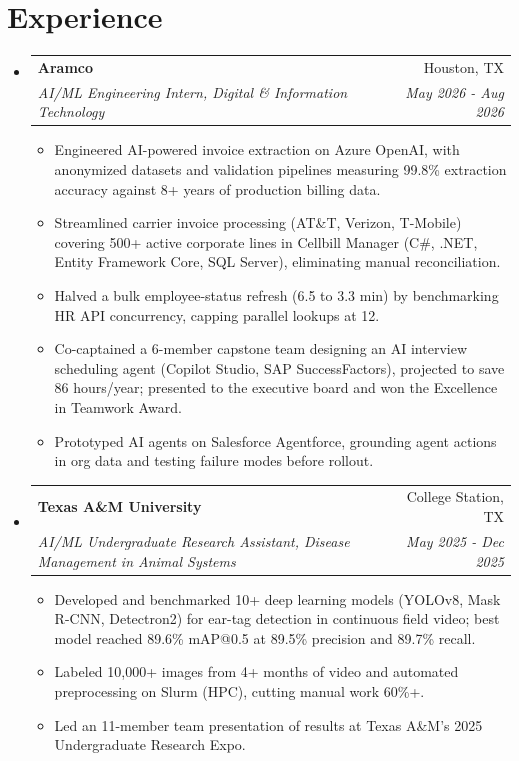 \documentclass[letterpaper,11pt]{article}
\makeatletter
\newcommand{\resumeItem}[1]{\item\small{{#1 \vspace{-2pt}}}}
\newcommand{\resumeSubheading}[4]{
  \vspace{-2pt}\item
    \begin{tabular*}{0.97\textwidth}[t]{l@{\extracolsep{\fill}}r}
      \textbf{#1} & #2 \\
      \textit{\small#3} & \textit{\small #4} \\
    \end{tabular*}\vspace{-7pt}
}
\newcommand{\resumeSubHeadingListStart}{\begin{itemize}[leftmargin=0.15in, label={}]}
\newcommand{\resumeSubHeadingListEnd}{\end{itemize}}
\newcommand{\resumeItemListStart}{\begin{itemize}}
\newcommand{\resumeItemListEnd}{\end{itemize}\vspace{-5pt}}
\makeatother
\begin{document}
\section{Experience}
  \resumeSubHeadingListStart
    \resumeSubheading
      {Aramco}{Houston, TX}
      {AI/ML Engineering Intern, Digital \& Information Technology}{May 2026 - Aug 2026}
      \resumeItemListStart
        \resumeItem{Engineered AI-powered invoice extraction on Azure OpenAI, with anonymized datasets and validation pipelines measuring 99.8\% extraction accuracy against 8+ years of production billing data.}
        \resumeItem{Streamlined carrier invoice processing (AT\&T, Verizon, T-Mobile) covering 500+ active corporate lines in Cellbill Manager (C\#, .NET, Entity Framework Core, SQL Server), eliminating manual reconciliation.}
        \resumeItem{Halved a bulk employee-status refresh (6.5 to 3.3 min) by benchmarking HR API concurrency, capping parallel lookups at 12.}
        \resumeItem{Co-captained a 6-member capstone team designing an AI interview scheduling agent (Copilot Studio, SAP SuccessFactors), projected to save 86 hours/year; presented to the executive board and won the Excellence in Teamwork Award.}
        \resumeItem{Prototyped AI agents on Salesforce Agentforce, grounding agent actions in org data and testing failure modes before rollout.}
      \resumeItemListEnd

    \resumeSubheading
      {Texas A\&M University}{College Station, TX}
      {AI/ML Undergraduate Research Assistant, Disease Management in Animal Systems}{May 2025 - Dec 2025}
      \resumeItemListStart
        \resumeItem{Developed and benchmarked 10+ deep learning models (YOLOv8, Mask R-CNN, Detectron2) for ear-tag detection in continuous field video; best model reached 89.6\% mAP@0.5 at 89.5\% precision and 89.7\% recall.}
        \resumeItem{Labeled 10,000+ images from 4+ months of video and automated preprocessing on Slurm (HPC), cutting manual work 60\%+.}
        \resumeItem{Led an 11-member team presentation of results at Texas A\&M's 2025 Undergraduate Research Expo.}
      \resumeItemListEnd
  \resumeSubHeadingListEnd
\end{document}
